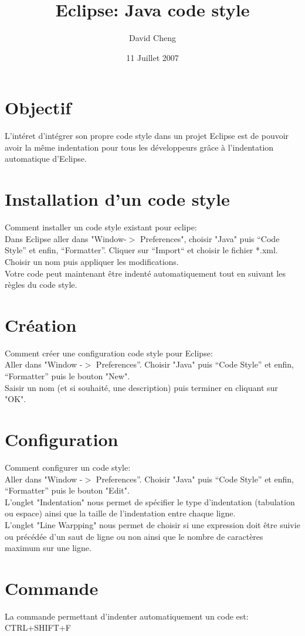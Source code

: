 \documentclass{article}
\title{Eclipse: Java code style}
\author{David Cheng}
\date{11 Juillet 2007}
\begin{document}
\maketitle
\section{Objectif}
L'intéret d'intégrer son propre code style dans un projet Eclipse 
est de pouvoir avoir la même indentation pour tous les développeurs 
grâce à l'indentation automatique d'Eclipse.

\section{Installation d'un code style}
Comment installer un code style existant pour eclipe:\\

Dans Eclipse aller dans  "Window-$>$ Preferences",
choisir "Java" puis ``Code Style'' et enfin, ``Formatter''.
Cliquer sur ``Import`` et choisir le fichier *.xml.
Choisir un nom puis appliquer les modifications.\\

Votre code peut maintenant être indenté automatiquement tout en suivant les règles du code style.

\section{Cr\'eation}

Comment cr\'eer une configuration code style pour Eclipse:\\

Aller dans "Window -$>$ Preferences''.
Choisir "Java" puis ``Code Style'' et enfin, ``Formatter'' puis le bouton "New".\\

Saisir un nom (et si souhait\'e, une description) puis terminer en cliquant sur "OK".



\section{Configuration}

Comment configurer un code style:\\
Aller dans "Window -$>$ Preferences''.
Choisir "Java" puis  ``Code Style'' et enfin, ``Formatter'' puis le bouton "Edit".\\

L'onglet "Indentation" nous permet de spécifier le type d'indentation (tabulation ou espace) ainsi que la taille de l'indentation entre chaque ligne.\\

L'onglet "Line Warpping" nous permet de choisir si une expression doit être suivie ou précédée d'un saut de ligne ou non ainsi que le nombre de caractères maximum sur une ligne.

\section{Commande}

La commande permettant d'indenter automatiquement un code est:\\

CTRL+SHIFT+F
\end{document}
